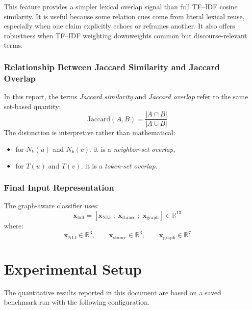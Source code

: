 \documentclass[11pt,a4paper]{article}
\begin{document}
This feature provides a simpler lexical overlap signal than full TF--IDF cosine similarity. It is useful because some relation cues come from literal lexical reuse, especially when one claim explicitly echoes or reframes another. It also offers robustness when TF--IDF weighting downweights common but discourse-relevant terms.

\subsubsection{Relationship Between Jaccard Similarity and Jaccard Overlap}
In this report, the terms \emph{Jaccard similarity} and \emph{Jaccard overlap} refer to the same set-based quantity:
\begin{equation}
\mathrm{Jaccard}(A,B)=\frac{|A\cap B|}{|A\cup B|}
\end{equation}
The distinction is interpretive rather than mathematical:
\begin{itemize}[leftmargin=1.5em]
  \item for \(N_k(u)\) and \(N_k(v)\), it is a \emph{neighbor-set overlap},
  \item for \(T(u)\) and \(T(v)\), it is a \emph{token-set overlap}.
\end{itemize}

\subsubsection{Final Input Representation}
The graph-aware classifier uses:
\begin{equation}
\mathbf{x}_{\text{full}} =
\left[
\mathbf{x}_{\text{NLI}} \; ; \; \mathbf{x}_{\text{stance}} \; ; \; \mathbf{x}_{\text{graph}}
\right]
\in \mathbb{R}^{13}
\end{equation}
where:
\[
\mathbf{x}_{\text{NLI}} \in \mathbb{R}^{3}, \qquad
\mathbf{x}_{\text{stance}} \in \mathbb{R}^{3}, \qquad
\mathbf{x}_{\text{graph}} \in \mathbb{R}^{7}
\]

\section{Experimental Setup}
The quantitative results reported in this document are based on a saved benchmark run with the following configuration.
\end{document}
